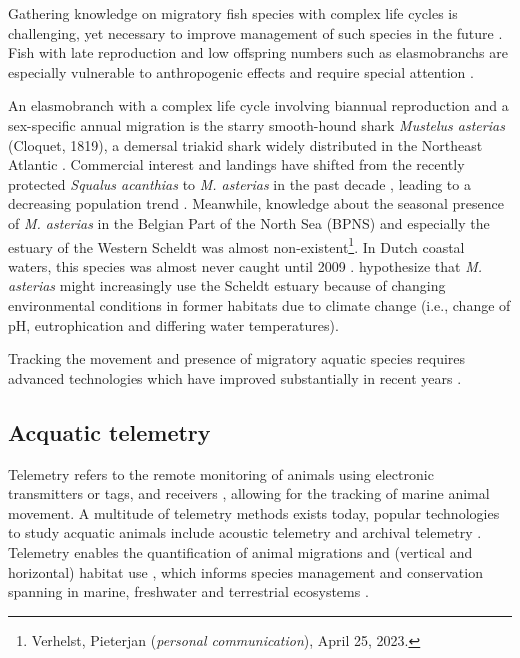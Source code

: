 \documentclass[
  authoryear,
  review,
  3p]{elsarticle}
\begin{document}
Gathering knowledge on migratory fish species with complex life cycles
is challenging, yet necessary to improve management of such species in
the future \citep{brownscombe_2022}. Fish with late reproduction and low
offspring numbers such as elasmobranchs are especially vulnerable to
anthropogenic effects and require special attention
\citep{stevens_2000}.

An elasmobranch with a complex life cycle involving biannual
reproduction and a sex-specific annual migration is the starry
smooth-hound shark \emph{Mustelus asterias} (Cloquet, 1819), a demersal
triakid shark widely distributed in the Northeast Atlantic
\citep{breve_2016, griffiths_2020}. Commercial interest and landings
have shifted from the recently protected \emph{Squalus acanthias} to
\emph{M. asterias} in the past decade \citep{mccullyphillips_2015},
leading to a decreasing population trend \citep[status: \emph{Near
Threatened}]{ices_2022}. Meanwhile, knowledge about the seasonal
presence of \emph{M. asterias} in the Belgian Part of the North Sea
(BPNS) and especially the estuary of the Western Scheldt was almost
non-existent\footnote{Verhelst, Pieterjan (\emph{personal
  communication}), April 25, 2023.}. In Dutch coastal waters, this
species was almost never caught until 2009 \citep{breve_2016}.
\citet{breve_2016} hypothesize that \emph{M. asterias} might
increasingly use the Scheldt estuary because of changing environmental
conditions in former habitats due to climate change (i.e., change of pH,
eutrophication and differing water temperatures).

Tracking the movement and presence of migratory aquatic species requires
advanced technologies which have improved substantially in recent years
\citep{whoriskey_2019}.

\hypertarget{acquatic-telemetry}{%
\subsection{Acquatic telemetry}\label{acquatic-telemetry}}

Telemetry refers to the remote monitoring of animals using electronic
transmitters or tags, and receivers \citep{whoriskey_2019}, allowing for
the tracking of marine animal movement. A multitude of telemetry methods
exists today, popular technologies to study acquatic animals include
acoustic telemetry and archival telemetry \citep{thorstad_2013}.
Telemetry enables the quantification of animal migrations and (vertical
and horizontal) habitat use \citep{hussey_2015}, which informs species
management and conservation spanning in marine, freshwater and
terrestrial ecosystems \citep{beger_2010}.
\end{document}
